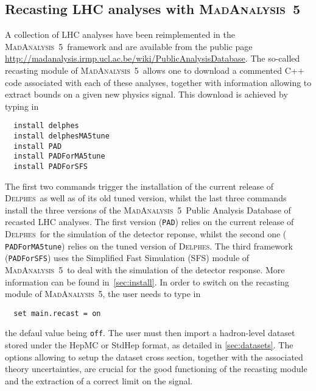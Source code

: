 \documentclass[a4paper]{article}
\newcommand{\MA}{\textsc{MadAnalysis}~5}
\newcommand{\DEL}{\textsc{Delphes}}
\begin{document}
\vspace{3cm}
\begin{shaded}
\section{\Large Recasting LHC analyses with \MA}
\end{shaded}
A collection of LHC analyses have been reimplemented in the \MA\ framework and
are available from the public page
\href{http://madanalysis.irmp.ucl.ac.be/wiki/PublicAnalysisDatabase}
{http://madanalysis.irmp.ucl.ac.be/wiki/PublicAnalysisDatabase}. The so-called
recasting module of \MA\ allows one to download a commented C++ code associated
with each of these analyses, together with information allowing to extract
bounds on a given new physics signal. This download is achieved by typing in
{\color{ao} \begin{verbatim}
  install delphes
  install delphesMA5tune
  install PAD
  install PADForMA5tune
  install PADForSFS
\end{verbatim}}
\noindent The first two commands trigger the installation of the current release
of \DEL\ as well as of its old tuned version, whilst the last three commands
install the three versions of the \MA\ Public Analysis Database of recasted LHC
analyses. The first version ({\tt PAD}) relies on the current release of \DEL\
for the simulation of the detector reponse, whilst the second one ({\tt
PADForMA5tune}) relies on the
tuned version of \DEL. The third framework ({\tt PADForSFS}) uses the Simplified
Fast Simulation (SFS) module of \MA\ to deal with the simulation of the
detector response. More information can be found in~\autoref{sec:install}.
In order to switch on the recasting module of \MA, the user needs to type in
{\color{ao} \begin{verbatim}
  set main.recast = on
\end{verbatim}}
\noindent the defaul value being \verb|off|. The user must then import a
hadron-level dataset stored under the HepMC or StdHep format, as detailed in
\autoref{sec:datasets}. The options allowing to setup the dataset cross section,
together with the associated theory uncertainties, are crucial for
the good functioning of the recasting module and the extraction of a correct
limit on the signal.
\end{document}
